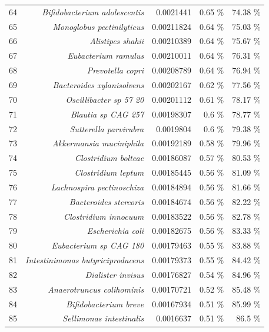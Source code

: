 \documentclass{article}
\begin{document}
\begin{table}[h]
\begin{centering}
\begin{tabular}{|r|r|r|r|r|}
      64 & \textit{Bifidobacterium adolescentis} & 0.0021441 & 0.65 \% & 74.38 \% \\
      65 & \textit{Monoglobus pectinilyticus} & 0.00211824 & 0.64 \% & 75.03 \% \\
      66 & \textit{Alistipes shahii} & 0.00210389 & 0.64 \% & 75.67 \% \\
      67 & \textit{Eubacterium ramulus} & 0.00210011 & 0.64 \% & 76.31 \% \\
      68 & \textit{Prevotella copri} & 0.00208789 & 0.64 \% & 76.94 \% \\
      69 & \textit{Bacteroides xylanisolvens} & 0.00202167 & 0.62 \% & 77.56 \% \\
      70 & \textit{Oscillibacter sp 57 20} & 0.00201112 & 0.61 \% & 78.17 \% \\
      71 & \textit{Blautia sp CAG 257} & 0.00198307 & 0.6 \% & 78.77 \% \\
      72 & \textit{Sutterella parvirubra} & 0.0019804 & 0.6 \% & 79.38 \% \\
      73 & \textit{Akkermansia muciniphila} & 0.00192189 & 0.58 \% & 79.96 \% \\
      74 & \textit{Clostridium bolteae} & 0.00186087 & 0.57 \% & 80.53 \% \\
      75 & \textit{Clostridium leptum} & 0.00185445 & 0.56 \% & 81.09 \% \\
      76 & \textit{Lachnospira pectinoschiza} & 0.00184894 & 0.56 \% & 81.66 \% \\
      77 & \textit{Bacteroides stercoris} & 0.00184674 & 0.56 \% & 82.22 \% \\
      78 & \textit{Clostridium innocuum} & 0.00183522 & 0.56 \% & 82.78 \% \\
      79 & \textit{Escherichia coli} & 0.00182675 & 0.56 \% & 83.33 \% \\
      80 & \textit{Eubacterium sp CAG 180} & 0.00179463 & 0.55 \% & 83.88 \% \\
      81 & \textit{Intestinimonas butyriciproducens} & 0.00179373 & 0.55 \% & 84.42 \% \\
      82 & \textit{Dialister invisus} & 0.00176827 & 0.54 \% & 84.96 \% \\
      83 & \textit{Anaerotruncus colihominis} & 0.00170721 & 0.52 \% & 85.48 \% \\
      84 & \textit{Bifidobacterium breve} & 0.00167934 & 0.51 \% & 85.99 \% \\
      85 & \textit{Sellimonas intestinalis} & 0.0016637 & 0.51 \% & 86.5 \% \\

\end{tabular}
\end{centering}
\end{table}
\end{document}

